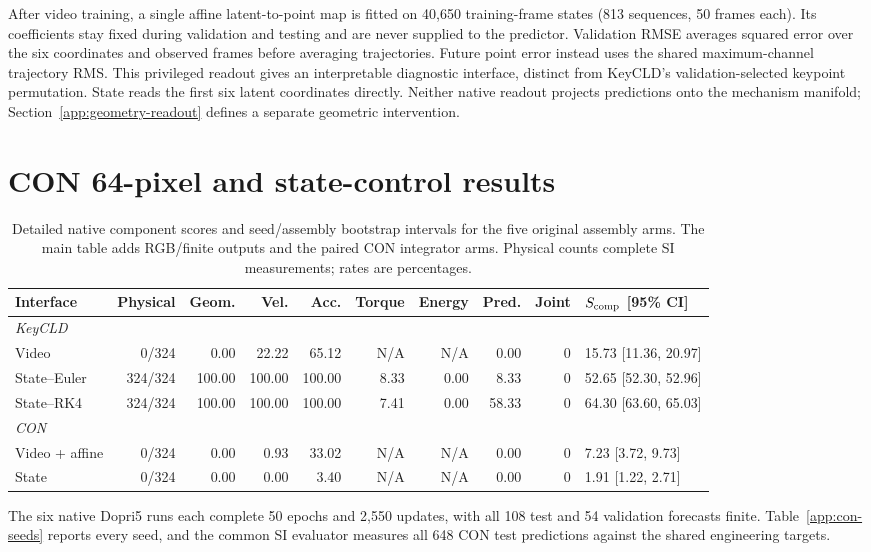 After video training, a single affine latent-to-point map is fitted on 40,650 training-frame states (813 sequences, 50 frames each). Its coefficients stay fixed during validation and testing and are never supplied to the predictor. Validation RMSE averages squared error over the six coordinates and observed frames before averaging trajectories. Future point error instead uses the shared maximum-channel trajectory RMS. This privileged readout gives an interpretable diagnostic interface, distinct from KeyCLD's validation-selected keypoint permutation. State reads the first six latent coordinates directly. Neither native readout projects predictions onto the mechanism manifold; Section~\ref{app:geometry-readout} defines a separate geometric intervention.

\section{CON 64-pixel and state-control results}
\begin{table}[t]
\caption{Detailed native component scores and seed/assembly bootstrap intervals for the five original assembly arms. The main table adds RGB/finite outputs and the paired CON integrator arms. Physical counts complete SI measurements; rates are percentages.}
\centering\small
\begin{tabular}{lrrrrrrrrl}
\toprule
Interface & Physical & Geom. & Vel. & Acc. & Torque & Energy & Pred. & Joint & $S_{\rm comp}$ [95\% CI]\\
\midrule
\multicolumn{10}{l}{\textit{KeyCLD}}\\
Video & 0/324 & 0.00 & 22.22 & 65.12 & N/A & N/A & 0.00 & 0 & 15.73 [11.36, 20.97] \\
State--Euler & 324/324 & 100.00 & 100.00 & 100.00 & 8.33 & 0.00 & 8.33 & 0 & 52.65 [52.30, 52.96] \\
State--RK4 & 324/324 & 100.00 & 100.00 & 100.00 & 7.41 & 0.00 & 58.33 & 0 & 64.30 [63.60, 65.03] \\
\midrule
\multicolumn{10}{l}{\textit{CON}}\\
Video + affine & 0/324 & 0.00 & 0.93 & 33.02 & N/A & N/A & 0.00 & 0 & 7.23 [3.72, 9.73] \\
State & 0/324 & 0.00 & 0.00 & 3.40 & N/A & N/A & 0.00 & 0 & 1.91 [1.22, 2.71] \\
\bottomrule
\end{tabular}
\end{table}

\label{app:con-results}
The six native Dopri5 runs each complete 50 epochs and 2,550 updates, with all 108 test and 54 validation forecasts finite. Table~\ref{app:con-seeds} reports every seed, and the common SI evaluator measures all 648 CON test predictions against the shared engineering targets.

